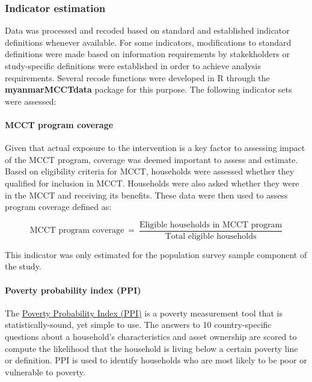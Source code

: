 \documentclass[12pt,a4paper]{article}
\let\oldparagraph\paragraph
\renewcommand{\paragraph}[1]{\oldparagraph{#1}\mbox{}}
\begin{document}
\hypertarget{indicator-estimation}{%
\subsubsection{Indicator estimation}\label{indicator-estimation}}

Data was processed and recoded based on standard and established indicator definitions whenever available. For some indicators, modifications to standard definitions were made based on information requirements by stakekholders or study-specific definitions were established in order to achieve analysis requirements. Several recode functions were developed in R through the \textbf{myanmarMCCTdata} package for this purpose. The following indicator sets were assessed:

\hypertarget{mcct-program-coverage}{%
\paragraph{MCCT program coverage}\label{mcct-program-coverage}}

Given that actual exposure to the intervention is a key factor to assessing impact of the MCCT program, coverage was deemed important to assess and estimate. Based on eligibility criteria for MCCT, households were assessed whether they qualified for inclusion in MCCT. Households were also asked whether they were in the MCCT and receiving its benefits. These data were then used to assess program coverage defined as:

\[ \text{MCCT program coverage} ~ = ~ \frac{\text{Eligible households in MCCT program}}{\text{Total eligible households}} \]

This indicator was only estimated for the population survey sample component of the study.

\hypertarget{ppi}{%
\paragraph{Poverty probability index (PPI)}\label{ppi}}

The \href{https://www.povertyindex.org}{Poverty Probability Index (PPI)} is a poverty measurement tool that is statistically-sound, yet simple to use. The answers to 10 country-specific questions about a household's characteristics and asset ownership are scored to compute the likelihood that the household is living below a certain poverty line or definition\citep{InnovationsforPovertyAction2019}. PPI is used to identify households who are most likely to be poor or vulnerable to poverty.
\end{document}
